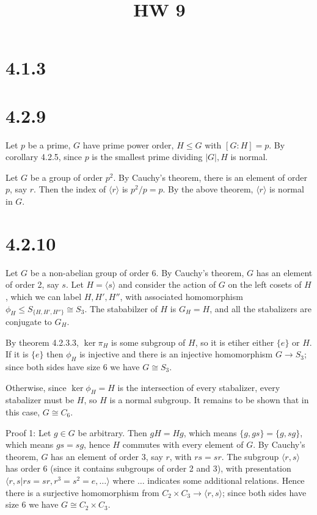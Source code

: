 \documentclass{article}
\title{HW 9}
\date{}
\def\<{\langle}
\def\>{\rangle}
\begin{document}
\maketitle

\section*{4.1.3}

\section*{4.2.9}

Let $p$ be a prime, $G$ have prime power order, $H \le G$ with $[G:H] = p$. By corollary 4.2.5, since $p$ is the smallest prime dividing $|G|, H$ is normal.

Let $G$ be a group of order $p^2$. By Cauchy's theorem, there is an element of order $p$, say $r$. Then the index of $\<r\>$ is $p^2 / p = p$. By the above theorem, $\<r\>$ is normal in $G$.

\section*{4.2.10}

Let $G$ be a non-abelian group of order 6. By Cauchy's theorem, $G$ has an element of order 2, say $s$. Let $H = \<s\>$ and consider the action of $G$ on the left cosets of $H$, which we can label $H, H', H''$, with associated homomorphism $\phi_H \le S_{\{H, H', H''\}} \cong S_3$. The stababilzer of $H$ is $G_H = H$, and all the stabalizers are conjugate to $G_H$. 

By theorem 4.2.3.3, $\ker \pi_H$ is some subgroup of $H$, so it is etiher either $\{e\}$ or $H$. If it is $\{e\}$ then $\phi_H$ is injective and there is an injective homomorphism $G \to S_3$; since both sides have size 6 we have $G \cong S_3$. 

Otherwise, since $\ker \phi_H = H$ is the intersection of every stabalizer, every stabalizer must be $H$, so $H$ is a normal subgroup. It remains to be shown that in this case, $G \cong C_6$.

Proof 1: Let $g \in G$ be arbitrary. Then $gH = Hg$, which means $\{g, gs\} = \{g, sg\}$, which means $gs = sg$, hence $H$ commutes with every element of $G$. By Cauchy's theorem, $G$ has an element of order 3, say $r$, with $rs = sr$. The subgroup $\<r, s\>$ has order 6 (since it contains subgroups of order 2 and 3), with presentation $\<r, s | rs = sr, r^3 = s^2 = e, \ldots \>$ where $\ldots$ indicates some additional relations. Hence there is a surjective homomorphism from $C_2 \times C_3 \to \<r, s\>$; since both sides have size 6 we have $G \cong C_2 \times C_3$.
\end{document}
